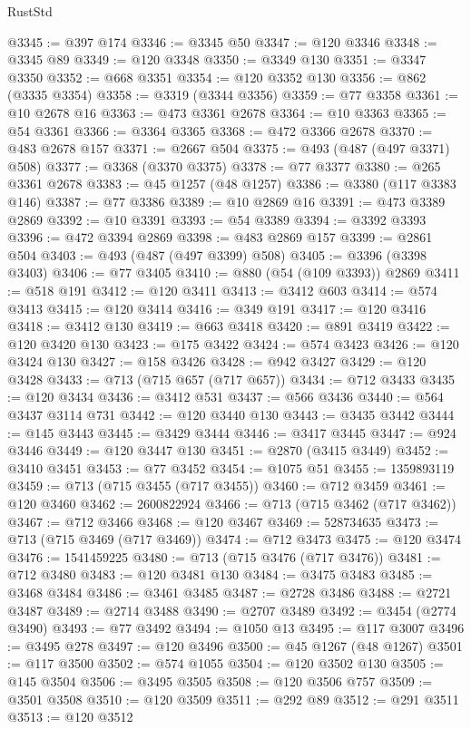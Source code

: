 \begin{lexlean}{RustStd}
\begin{coremodule}
{\begin{coremodule}
{{{{{{{{{{{{{{{{{{{{{{{{{{{{{{{{{{{{{{{{{{{{{{{{{{{{{{{{{{{{@3345 := @397 @174
@3346 := @3345 @50
@3347 := @120 @3346
@3348 := @3345 @89
@3349 := @120 @3348
@3350 := @3349 @130
@3351 := @3347 @3350
@3352 := @668 @3351
@3354 := @120 @3352 @130
@3356 := @862 (@3335 @3354)
@3358 := @3319 (@3344 @3356)
@3359 := @77 @3358
@3361 := @10 @2678 @16
@3363 := @473 @3361 @2678
@3364 := @10 @3363
@3365 := @54 @3361
@3366 := @3364 @3365
@3368 := @472 @3366 @2678
@3370 := @483 @2678 @157
@3371 := @2667 @504
@3375 := @493 (@487 (@497 @3371) @508)
@3377 := @3368 (@3370 @3375)
@3378 := @77 @3377
@3380 := @265 @3361 @2678
@3383 := @45 @1257 (@48 @1257)
@3386 := @3380 (@117 @3383 @146)
@3387 := @77 @3386
@3389 := @10 @2869 @16
@3391 := @473 @3389 @2869
@3392 := @10 @3391
@3393 := @54 @3389
@3394 := @3392 @3393
@3396 := @472 @3394 @2869
@3398 := @483 @2869 @157
@3399 := @2861 @504
@3403 := @493 (@487 (@497 @3399) @508)
@3405 := @3396 (@3398 @3403)
@3406 := @77 @3405
@3410 := @880 (@54 (@109 @3393)) @2869
@3411 := @518 @191
@3412 := @120 @3411
@3413 := @3412 @603
@3414 := @574 @3413
@3415 := @120 @3414
@3416 := @349 @191
@3417 := @120 @3416
@3418 := @3412 @130
@3419 := @663 @3418
@3420 := @891 @3419
@3422 := @120 @3420 @130
@3423 := @175 @3422
@3424 := @574 @3423
@3426 := @120 @3424 @130
@3427 := @158 @3426
@3428 := @942 @3427
@3429 := @120 @3428
@3433 := @713 (@715 @657 (@717 @657))
@3434 := @712 @3433
@3435 := @120 @3434
@3436 := @3412 @531
@3437 := @566 @3436
@3440 := @564 @3437 @3114 @731
@3442 := @120 @3440 @130
@3443 := @3435 @3442
@3444 := @145 @3443
@3445 := @3429 @3444
@3446 := @3417 @3445
@3447 := @924 @3446
@3449 := @120 @3447 @130
@3451 := @2870 (@3415 @3449)
@3452 := @3410 @3451
@3453 := @77 @3452
@3454 := @1075 @51
@3455 := 1359893119
@3459 := @713 (@715 @3455 (@717 @3455))
@3460 := @712 @3459
@3461 := @120 @3460
@3462 := 2600822924
@3466 := @713 (@715 @3462 (@717 @3462))
@3467 := @712 @3466
@3468 := @120 @3467
@3469 := 528734635
@3473 := @713 (@715 @3469 (@717 @3469))
@3474 := @712 @3473
@3475 := @120 @3474
@3476 := 1541459225
@3480 := @713 (@715 @3476 (@717 @3476))
@3481 := @712 @3480
@3483 := @120 @3481 @130
@3484 := @3475 @3483
@3485 := @3468 @3484
@3486 := @3461 @3485
@3487 := @2728 @3486
@3488 := @2721 @3487
@3489 := @2714 @3488
@3490 := @2707 @3489
@3492 := @3454 (@2774 @3490)
@3493 := @77 @3492
@3494 := @1050 @13
@3495 := @117 @3007
@3496 := @3495 @278
@3497 := @120 @3496
@3500 := @45 @1267 (@48 @1267)
@3501 := @117 @3500
@3502 := @574 @1055
@3504 := @120 @3502 @130
@3505 := @145 @3504
@3506 := @3495 @3505
@3508 := @120 @3506 @757
@3509 := @3501 @3508
@3510 := @120 @3509
@3511 := @292 @89
@3512 := @291 @3511
@3513 := @120 @3512
}}}}}}}}}}}}}}}}}}}}}}}}}}}}}}}}}}}}}}}}}}}}}}}}}}}}}}}}}}}}
\end{coremodule}}
\end{coremodule}
\end{lexlean}

